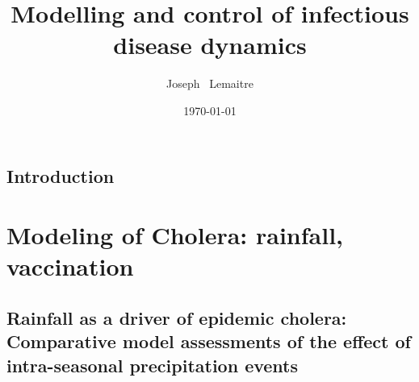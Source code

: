 \documentclass[nohyper,nobib,a4]{tufte-book}
\title{Modelling and control of infectious disease dynamics}
\date{\today}
\author[Joseph Lemaitre]{Joseph \ Lemaitre}
\newcommand{\openepigraph}[2]{%
  \begin{fullwidth}
  \sffamily\large
  \begin{doublespace}
  \noindent\allcaps{#1}\\%
  \noindent\allcaps{#2}%
  \end{doublespace}
  \end{fullwidth}
}
\newcommand{\blankpage}{\newpage\hbox{}\thispagestyle{empty}\newpage}
\begin{document}
\frontmatter










\cleardoublepage
\chapter*{Introduction}


\mainmatter

\part{Modeling of Cholera: rainfall, vaccination}

\chapter{Rainfall as a driver of epidemic cholera: Comparative model assessments of the effect of intra-seasonal precipitation events}
\label{ch:cholera-rainfall}
\end{document}
